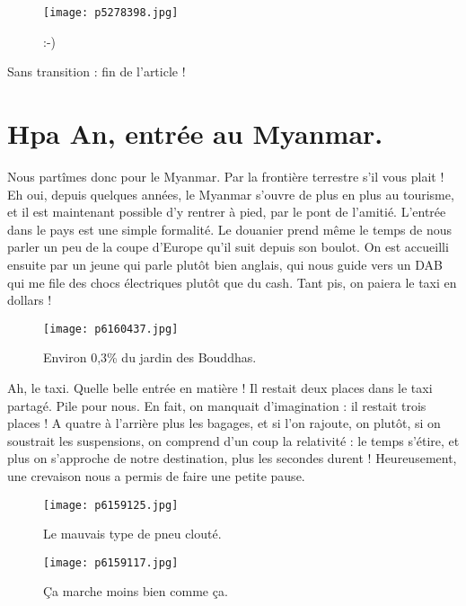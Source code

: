 \documentclass{book}
\begin{document}
\begin{figure}[h]
\centering
\texttt{[image: p5278398.jpg]}
\caption*{:-)}
\end{figure}

Sans transition : fin de l'article !



\chapter{Hpa An, entrée au Myanmar.}
Nous partîmes donc pour le Myanmar. Par la frontière terrestre s'il vous plait ! Eh oui, depuis quelques années, le Myanmar s'ouvre de plus en plus au tourisme, et il est maintenant possible d'y rentrer à pied, par le pont de l'amitié. L'entrée dans le pays est une simple formalité. Le douanier prend même le temps de nous parler un peu de la coupe d'Europe qu'il suit depuis son boulot. On est accueilli ensuite par un jeune qui parle plutôt bien anglais, qui nous guide vers un DAB qui me file des chocs électriques plutôt que du cash. Tant pis, on paiera le taxi en dollars !


\begin{figure}[h]
\centering
\texttt{[image: p6160437.jpg]}
\caption*{Environ 0,3\% du jardin des Bouddhas.}
\end{figure}

Ah, le taxi. Quelle belle entrée en matière ! Il restait deux places dans le taxi partagé. Pile pour nous. En fait, on manquait d'imagination : il restait trois places ! A quatre à l'arrière plus les bagages, et si l'on rajoute, on plutôt, si on soustrait les suspensions, on comprend d'un coup la relativité : le temps s'étire, et plus on s'approche de notre destination, plus les secondes durent ! Heureusement, une crevaison nous a permis de faire une petite pause.


\begin{figure}[h]
\centering
\texttt{[image: p6159125.jpg]}
\caption*{Le mauvais type de pneu clouté.}
\end{figure}


\begin{figure}[h]
\centering
\texttt{[image: p6159117.jpg]}
\caption*{Ça marche moins bien comme ça.}
\end{figure}
\end{document}
